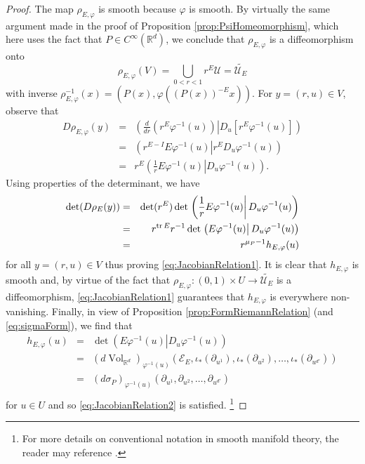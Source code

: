 \documentclass[11pt, letter]{book}
\renewcommand\det{\operatorname{det}}
\newcommand{\Vol}{\operatorname{Vol}}
\begin{document}
\begin{proof}
The map $\rho_{E,\varphi}$ is smooth because $\varphi$ is smooth. By virtually the same argument made in the proof of Proposition \ref{prop:PsiHomeomorphism}, which here uses the fact that $P\in C^\infty(\mathbb{R}^d)$, we conclude that $\rho_{E,\varphi}$ is a diffeomorphism onto 
\begin{equation*}\rho_{E,\varphi}(V)=\bigcup_{0<r<1}r^E\mathcal{U}=\widetilde{\mathcal{U}_E}
\end{equation*}
with inverse $\rho_{E,\varphi}^{-1}(x)=(P(x),\varphi((P(x))^{-E}x))$. For $y=(r,u)\in V$, observe that
\begin{eqnarray*}
D\rho_{E,\varphi}(y)&=&\left.\left(\frac{d}{dr}(r^E\varphi^{-1}(u)) \right\vert D_u\left[r^E\varphi^{-1}(u)\right]\right)\\
&=&\left.\left(r^{E-I}E\varphi^{-1}(u)\right\vert r^E D_u\varphi^{-1}(u)\right)\\
&=&r^E\left.\left(\frac{1}{r}E\varphi^{-1}(u)\right\vert D_u\varphi^{-1}(u)\right).
\end{eqnarray*}
Using properties of the determinant, we have
\begin{eqnarray*}
    \det(D\rho_E(y))&=&\det(r^E)\det\left.\left(\frac{1}{r}E\varphi^{-1}(u)\right\vert D_u\varphi^{-1}(u)\right)\\
    &=&r^{\tr E}r^{-1}\det\left.\left(E\varphi^{-1}(u)\right\vert D_u\varphi^{-1}(u)\right)\\
    &=&r^{\mu_P-1}h_{E,\varphi}(u)
\end{eqnarray*}
for all $y=(r,u)\in V$ thus proving \eqref{eq:JacobianRelation1}. It is clear that $h_{E,\varphi}$ is smooth and, by virtue of the fact that $\rho_{E,\varphi}:(0,1)\times U\to \widetilde{\mathcal{U}_E}$ is a diffeomorphism, \eqref{eq:JacobianRelation1} guarantees that $h_{E,\varphi}$ is everywhere non-vanishing. Finally, 
in view of Proposition \ref{prop:FormRiemannRelation} (and \eqref{eq:sigmaForm}), we find that
\begin{eqnarray*}
    h_{E,\varphi}(u)&=&
    \det\left.\left(E\varphi^{-1}(u)\right\vert D_u\varphi^{-1}(u)\right)\\ \nonumber
    &=&
    (d\Vol_{\mathbb{R}^d})_{\varphi^{-1}(u)}(\mathcal{E}_E,\iota_*(\partial_{u^1}),\iota_*(\partial_{u^2}),\dots,\iota_*(\partial_{u^{d'}}))\\ \nonumber
    &=&\left(d\sigma_P\right)_{\varphi^{-1}(u)}(\partial_{u^1},\partial_{u^2},\dots,\partial_{u^{d'}})\\
\end{eqnarray*}
for $u\in U$ and so \eqref{eq:JacobianRelation2} is satisfied. \footnote{For more details on conventional notation in smooth manifold theory, the reader may reference \cite{lee_introduction_2003}.}
\end{proof}
\end{document}
